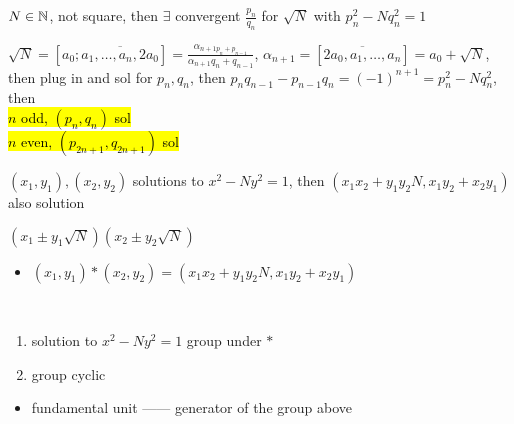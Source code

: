 \begin{prop}
    $N \in \mathbb{N}$, not square, then $\exists$ convergent $\frac{p_n}{q_n}$ for $\sqrt{N}$ with $p_n^2 - N q_{n}^2 = 1$
\end{prop}
\begin{pf}
    $\sqrt{N} = [a_0;\overline{a_1, \dots, a_n, 2a_0}] = \frac{\alpha_{n+1 p_n + p_{n-1}}}{\alpha_{n+1}q_n + q_{n-1}}$, $\alpha_{n+1} = [\overline{2a_0, a_1, \dots, a_n}] = a_0 + \sqrt{N}$,
    then plug in and sol for $p_n, q_n$, then $p_{n}q_{n-1} - p_{n-1}q_n = (-1)^{n+1} = p_n^2 - N q_n^2$, then\\
    \hl{$n$ odd, $(p_n, q_n)$ sol}\\
    \hl{$n$ even, $(p_{2n + 1}, q_{2n + 1})$ sol}
\end{pf}

\begin{lemma}
    $(x_1, y_1), (x_2, y_2)$ solutions to $x^2 - Ny^2 = 1$, then $(x_1 x_2 + y_1 y_2 N, x_1 y_2 + x_2 y_1)$ also solution
\end{lemma}
\begin{pf}
    $(x_1 \pm y_1\sqrt{N})(x_2 \pm y_2\sqrt{N})$
\end{pf}

\begin{itemize}
    \item $(x_1, y_1) \ast (x_2, y_2) = (x_1 x_2 + y_1 y_2 N, x_1 y_2 + x_2 y_1)$
\end{itemize}
\begin{fact}\,
    \begin{enumerate}
        \item solution to $x^2 - N y^2 = 1$ group under $\ast$
        \item group cyclic
    \end{enumerate}
\end{fact}
\begin{itemize}
    \item fundamental unit ------ generator of the group above
\end{itemize}




